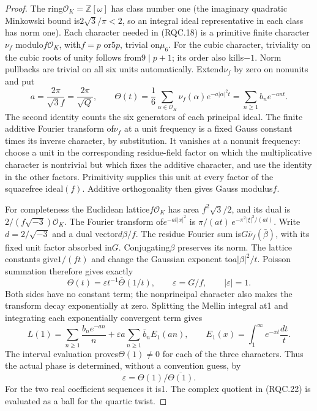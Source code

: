 \begin{proof}
The ring$\mathcal O_K=\mathbb Z[\omega]$ has class number one
(the imaginary quadratic Minkowski bound is$2\sqrt3/\pi<2$,
so an integral ideal representative in each class has norm one).
Each character needed in (RQC.18) is a primitive finite character
$\nu_f$ modulo$f\mathcal O_K$, with$f=p$ or$5p$, trivial on$\mu_6$.
For the cubic character, triviality on the cubic roots of unity follows
from$9\mid p+1$; its order also kills$-1$.  Norm pullbacks are
trivial on all six units automatically.
Extend$\nu_f$ by zero on nonunits and put
\[
 a=\frac{2\pi}{\sqrt3 f}=\frac{2\pi}{\sqrt Q},\qquad
 \Theta(t)=\frac16\sum_{\alpha\in\mathcal O_K}
             \nu_f(\alpha)e^{-a|\alpha|^2t}
           =\sum_{n\ge1}b_n e^{-ant}.
 \tag{RQC.19}
\]
The second identity counts the six generators of each principal ideal.
The finite additive Fourier transform of$\nu_f$ at a unit frequency
is a fixed Gauss constant times its inverse character, by substitution.
It vanishes at a nonunit frequency: choose a unit in the corresponding
residue-field factor on which the multiplicative character is nontrivial
but which fixes the additive character, and use the identity in the
other factors.  Primitivity supplies this unit at every factor of the
squarefree ideal$(f)$.  Additive orthogonality then gives Gauss modulus$f$.

For completeness the Euclidean lattice$f\mathcal O_K$ has area
$f^2\sqrt3/2$, and its dual is$2/(f\sqrt{-3})\mathcal O_K$.
The Fourier transform of$e^{-at|x|^2}$ is
$\pi/(at)\,e^{-\pi^2|\xi|^2/(at)}$.
Write$d=2/\sqrt{-3}$ and a dual vector$d\beta/f$.
The residue Fourier sum is$G\bar\nu_f(\bar\beta)$, with its fixed
unit factor absorbed in$G$.  Conjugating$\beta$ preserves its norm.
The lattice constants give$1/(ft)$ and change the Gaussian exponent
to$a|\beta|^2/t$.  Poisson summation therefore gives exactly
\[
       \Theta(t)=\varepsilon t^{-1}\bar\Theta(1/t),\qquad
       \varepsilon=G/f,\qquad |\varepsilon|=1.
 \tag{RQC.20}
\]
Both sides have no constant term; the nonprincipal character also
makes the transform decay exponentially at zero.
Splitting the Mellin integral at1 and integrating each exponentially
convergent term gives
\[
 L(1)=\sum_{n\ge1}\frac{b_n e^{-an}}n
       +\varepsilon a\sum_{n\ge1}\bar b_n E_1(an),\qquad
 E_1(x)=\int_1^\infty e^{-xt}\frac{dt}{t}.
 \tag{RQC.21}
\]
The interval evaluation proves$\Theta(1)\ne0$ for each of the three
characters.  Thus the actual phase is determined, without a convention
guess, by
\[
                     \varepsilon=\Theta(1)/\overline{\Theta(1)}.
 \tag{RQC.22}
\]
For the two real coefficient sequences it is1.  The complex quotient
in (RQC.22) is evaluated as a ball for the quartic twist.


\end{proof}
